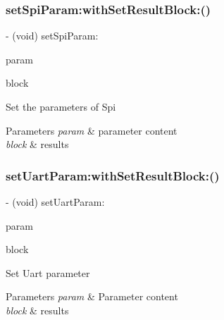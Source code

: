 \subsubsection{\texorpdfstring{set\+Spi\+Param\+:with\+Set\+Result\+Block\+:()}{setSpiParam:withSetResultBlock:()}}
{\footnotesize\ttfamily -\/ (void) set\+Spi\+Param\+: \begin{DoxyParamCaption}\item[{(\hyperlink{struct_p_v_s_d_k___m_o_u_n_t_a_p_i___s_p_i___p_a_r_a_m}{P\+V\+S\+D\+K\+\_\+\+M\+O\+U\+N\+T\+A\+P\+I\+\_\+\+S\+P\+I\+\_\+\+P\+A\+R\+AM})}]{param }\item[{withSetResultBlock:(P\+V\+Set\+Param\+Result\+Block)}]{block }\end{DoxyParamCaption}}

Set the parameters of Spi


\begin{DoxyParams}{Parameters}
{\em param} & parameter content \\
\hline
{\em block} & results \\
\hline
\end{DoxyParams}
\mbox{\label{interface_p_v_mount_controller_a7aabeac6feb132cbeee4a0d3d0622a37}} 
\subsubsection{\texorpdfstring{set\+Uart\+Param\+:with\+Set\+Result\+Block\+:()}{setUartParam:withSetResultBlock:()}}
{\footnotesize\ttfamily -\/ (void) set\+Uart\+Param\+: \begin{DoxyParamCaption}\item[{(\hyperlink{struct_p_v_s_d_k___m_o_u_n_t_a_p_i___u_a_r_t___p_a_r_a_m}{P\+V\+S\+D\+K\+\_\+\+M\+O\+U\+N\+T\+A\+P\+I\+\_\+\+U\+A\+R\+T\+\_\+\+P\+A\+R\+AM})}]{param }\item[{withSetResultBlock:(P\+V\+Set\+Param\+Result\+Block)}]{block }\end{DoxyParamCaption}}

Set Uart parameter


\begin{DoxyParams}{Parameters}
{\em param} & Parameter content \\
\hline
{\em block} & results \\
\hline
\end{DoxyParams}


